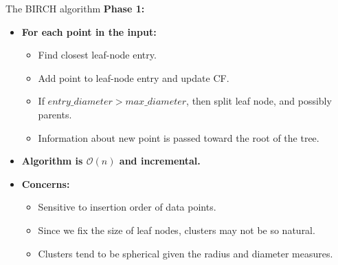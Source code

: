 \begin{frame}{The BIRCH algorithm}
  \textbf{Phase 1:}
  \begin{itemize}
  \item \textbf{For each point in the input:}
    \begin{itemize}
    \item Find closest leaf-node entry.
    \item Add point to leaf-node entry and update CF.
    \item If $entry\_diameter > max\_diameter$, then split leaf
      node, and possibly parents.
    \item Information about new point is passed toward the root of
      the tree.
    \end{itemize}
  \item \textbf{Algorithm is $\mathcal{O}(n)$ and incremental.}
  \item \textbf{Concerns:}
    \begin{itemize}
    \item Sensitive to insertion order of data points.
    \item Since we fix the size of leaf nodes, clusters may not be
      so natural.
    \item Clusters tend to be spherical given the radius and
      diameter measures.
    \end{itemize}
  \end{itemize}
\end{frame}

